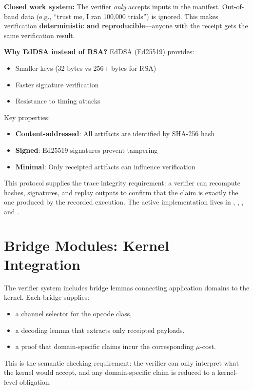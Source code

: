 \textbf{Closed work system:} The verifier \textit{only} accepts inputs in the manifest. Out-of-band data (e.g., ``trust me, I ran 100,000 trials'') is ignored. This makes verification \textbf{deterministic and reproducible}---anyone with the receipt gets the same verification result.

\textbf{Why EdDSA instead of RSA?} EdDSA (Ed25519) provides:
\begin{itemize}
    \item Smaller keys (32 bytes vs 256+ bytes for RSA)
    \item Faster signature verification
    \item Resistance to timing attacks
\end{itemize}


Key properties:
\begin{itemize}
    \item \textbf{Content-addressed}: All artifacts are identified by SHA-256 hash
    \item \textbf{Signed}: Ed25519 signatures prevent tampering
    \item \textbf{Minimal}: Only receipted artifacts can influence verification
\end{itemize}

This protocol supplies the trace integrity requirement: a verifier can recompute hashes, signatures, and replay outputs to confirm that the claim is exactly the one produced by the recorded execution.
The active implementation lives in , , , and .


\section{Bridge Modules: Kernel Integration}

The verifier system includes bridge lemmas connecting application domains to the kernel. Each bridge supplies:
\begin{itemize}
    \item a channel selector for the opcode class,
    \item a decoding lemma that extracts only receipted payloads,
    \item a proof that domain-specific claims incur the corresponding $\mu$-cost.
\end{itemize}

This is the semantic checking requirement: the verifier can only interpret what the kernel would accept, and any domain-specific claim is reduced to a kernel-level obligation.

